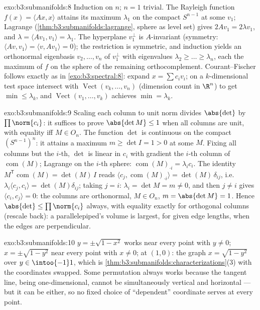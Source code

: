 \begin{solution}{exo:b3:submanifolds:8}
Induction on $n$; $n = 1$ trivial. The Rayleigh function
$f(x) = \langle Ax, x\rangle$ attains its maximum $\lambda_1$
on the compact $S^{n-1}$ at some $v_1$; Lagrange
(\cref{thm:b3:submanifolds:lagrange}, sphere as level set)
gives $2Av_1 = 2\lambda v_1$, and $\lambda = \langle Av_1,
v_1\rangle = \lambda_1$. The hyperplane $v_1^\perp$ is
$A$-invariant (symmetry: $\langle Av, v_1\rangle = \langle
v, Av_1\rangle = 0$); the restriction is symmetric, and
induction yields an orthonormal eigenbasis $v_2, \dots, v_n$
of $v_1^\perp$ with eigenvalues $\lambda_2 \geq \dots \geq
\lambda_n$, each the maximum of $f$ on the sphere of the
remaining orthocomplement. Courant--Fischer follows exactly
as in \cref{exo:b3:spectral:8}: expand $x = \sum c_iv_i$;
on a $k$-dimensional test space intersect with
$\operatorname{Vect}(v_k, \dots, v_n)$ (dimension count in
$\R^n$) to get $\min \leq \lambda_k$, and
$\operatorname{Vect}(v_1, \dots, v_k)$ achieves $\min =
\lambda_k$.
\end{solution}

\begin{solution}{exo:b3:submanifolds:9}
Scaling each column to unit norm divides $\abs{\det}$ by
$\prod\norm{c_i}$: it suffices to prove $\abs{\det M} \leq 1$
when all columns are unit, with equality iff $M \in O_n$. The
function $\det$ is continuous on the compact
$(S^{n-1})^n$: it attains a maximum $m \geq \det I = 1 > 0$
at some $M$. Fixing all columns but the $i$-th, $\det$ is
linear in $c_i$ with gradient the $i$-th column of
$\operatorname{com}(M)$; Lagrange on the $i$-th sphere:
$\operatorname{com}(M)_{\cdot i} = \lambda_i c_i$. The
identity $M^{\mathsf T}\operatorname{com}(M) = \det(M)\,I$
reads $\langle c_j, \operatorname{com}(M)_{\cdot i}\rangle =
\det(M)\,\delta_{ij}$, i.e.\ $\lambda_i\langle c_j,
c_i\rangle = \det(M)\delta_{ij}$; taking $j = i$: $\lambda_i
= \det M = m \neq 0$, and then $j \neq i$ gives $\langle c_i,
c_j\rangle = 0$: the columns are orthonormal, $M \in O_n$,
$m = \abs{\det M} = 1$. Hence $\abs{\det} \leq
\prod\norm{c_i}$ always, with equality exactly for orthogonal
columns (rescale back): a parallelepiped's volume is largest,
for given edge lengths, when the edges are perpendicular.
\end{solution}

\begin{solution}{exo:b3:submanifolds:10}
$y = \pm\sqrt{1 - x^2}$ works near every point with $y \neq
0$; $x = \pm\sqrt{1 - y^2}$ near every point with $x \neq 0$;
at $(1, 0)$: the graph $x = \sqrt{1 - y^2}$ over $y \in
\intoo{-1}1$, which is
\cref{thm:b3:submanifolds:characterizations}(3) with the
coordinates swapped. Some permutation always works because
the tangent line, being one-dimensional, cannot be
simultaneously vertical and horizontal --- but it can be
either, so no fixed choice of ``dependent'' coordinate
serves at every point.
\end{solution}


